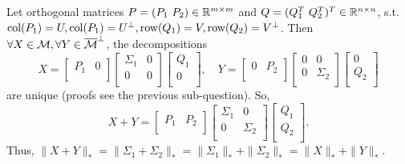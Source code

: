 Let orthogonal matrices $P=(P_1\ P_2)\in\real^{m\times m}$ and
$Q=(Q_1^T\ Q_2^T)^T\in{\mathbb{R}}^{n\times n}$, s.t.
${\text{col}}(P_1)=U, {\text{col}}(P_1) = U^\perp, {\text{row}}(Q_1) = V, {\text{row}}(Q_2)=V^\perp$.
Then $\forall X\in{\mathcal{M}}, \forall Y\in{\overline{{\mathcal{M}}}}^\perp$, the decompositions
\begin{equation}
    X =
        \begin{bmatrix}
        P_1 & 0\\
        \end{bmatrix}
        \begin{bmatrix}
        \Sigma_1 &   0 \\
        0 & 0\\
        \end{bmatrix}
        \begin{bmatrix}
        Q_1 \\
        0 \\
        \end{bmatrix},\quad
        Y =
        \begin{bmatrix}
        0 & P_2\\
        \end{bmatrix}
        \begin{bmatrix}
        0 &   0 \\
        0 & \Sigma_2\\
        \end{bmatrix}
        \begin{bmatrix}
        0 \\
        Q_2 \\
        \end{bmatrix}
\end{equation}
are unique (proofs see the previous sub-question).
So,
\begin{equation}
    X + Y =
        \begin{bmatrix}
        P_1 & P_2\\
        \end{bmatrix}
        \begin{bmatrix}
        \Sigma_1 &   0 \\
        0 & \Sigma_2\\
        \end{bmatrix}
        \begin{bmatrix}
        Q_1 \\
        Q_2 \\
        \end{bmatrix}.
\end{equation}
Thus,
$\|X+Y\|_*=\|\Sigma_1+\Sigma_2\|_*=\|\Sigma_1\|_*+\|\Sigma_2\|_*=\|X\|_*+\|Y\|_*$.
